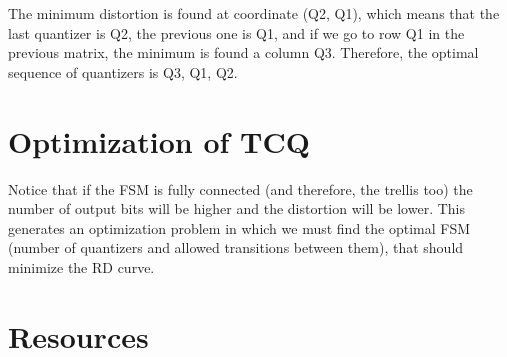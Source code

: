 The minimum distortion is found at coordinate (Q2, Q1), which means
that the last quantizer is Q2, the previous one is Q1, and if we go to
row Q1 in the previous matrix, the minimum is found a column
Q3. Therefore, the optimal sequence of quantizers is Q3, Q1, Q2.

\section{Optimization of TCQ}
Notice that if the FSM is fully connected (and therefore, the trellis
too) the number of output bits will be higher and the distortion will
be lower. This generates an optimization problem in which we must find
the optimal FSM (number of quantizers and allowed transitions between
them), that should minimize the RD curve.

\section{Resources}

\renewcommand{\addcontentsline}[3]{} %


